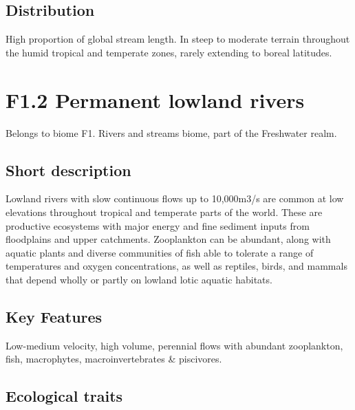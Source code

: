 \documentclass[
  letterpaper,
  DIV=11,
  numbers=noendperiod]{scrartcl}
\begin{document}
\subsection{Distribution}\label{distribution}

High proportion of global stream length. In steep to moderate terrain
throughout the humid tropical and temperate zones, rarely extending to
boreal latitudes.

\section{F1.2 Permanent lowland
rivers}\label{f1.2-permanent-lowland-rivers}

Belongs to biome F1. Rivers and streams biome, part of the Freshwater
realm.

\subsection{Short description}\label{short-description-1}

Lowland rivers with slow continuous flows up to 10,000m3/s are common at
low elevations throughout tropical and temperate parts of the world.
These are productive ecosystems with major energy and fine sediment
inputs from floodplains and upper catchments. Zooplankton can be
abundant, along with aquatic plants and diverse communities of fish able
to tolerate a range of temperatures and oxygen concentrations, as well
as reptiles, birds, and mammals that depend wholly or partly on lowland
lotic aquatic habitats.

\subsection{Key Features}\label{key-features-1}

Low-medium velocity, high volume, perennial flows with abundant
zooplankton, fish, macrophytes, macroinvertebrates \& piscivores.

\subsection{Ecological traits}\label{ecological-traits-1}
\end{document}
